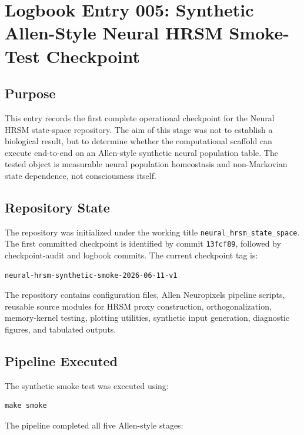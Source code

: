 \section{Logbook Entry 005: Synthetic Allen-Style Neural HRSM Smoke-Test Checkpoint}
\label{sec:logbook-entry-005-synthetic-smoke}

\subsection{Purpose}

This entry records the first complete operational checkpoint for the Neural HRSM state-space repository. The aim of this stage was not to establish a biological result, but to determine whether the computational scaffold can execute end-to-end on an Allen-style synthetic neural population table. The tested object is measurable neural population homeostasis and non-Markovian state dependence, not consciousness itself.

\subsection{Repository State}

The repository was initialized under the working title \texttt{neural\_hrsm\_state\_space}. The first committed checkpoint is identified by commit \texttt{13fcf89}, followed by checkpoint-audit and logbook commits. The current checkpoint tag is:

\begin{verbatim}
neural-hrsm-synthetic-smoke-2026-06-11-v1
\end{verbatim}

The repository contains configuration files, Allen Neuropixels pipeline scripts, reusable source modules for HRSM proxy construction, orthogonalization, memory-kernel testing, plotting utilities, synthetic input generation, diagnostic figures, and tabulated outputs.

\subsection{Pipeline Executed}

The synthetic smoke test was executed using:

\begin{verbatim}
make smoke
\end{verbatim}

The pipeline completed all five Allen-style stages:


